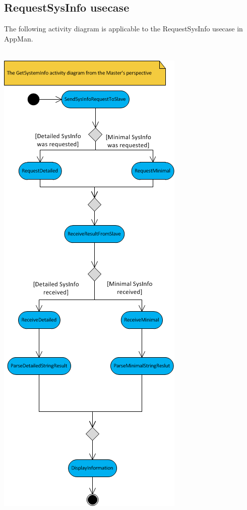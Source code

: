 \documentclass[a4paper,12pt,final]{article}
\begin{document}
\subsection{RequestSysInfo usecase}
The following activity diagram is applicable to the RequestSysInfo usecase in AppMan.\\
\textbf{\\}
\begin{center}
\includegraphics[scale=0.95]{GetSystemInfoActivityMASTER.png}
\end{center}
\end{document}
